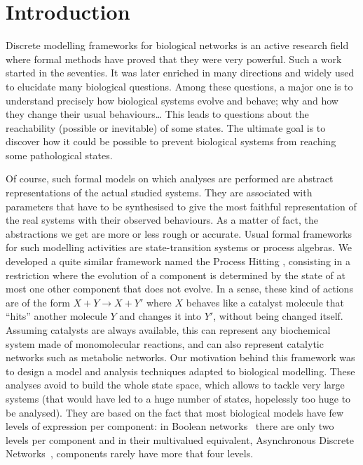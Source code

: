 \section{Introduction}
\label{sec:intro}

Discrete modelling frameworks for biological networks is an active research field where formal methods have proved that they were very powerful.
Such a work started in the seventies.
It was later enriched in many directions and widely used to elucidate many biological questions.
Among these questions, a major one is to understand precisely how biological systems evolve and behave; why and how they change their usual behaviours…
This leads to questions about the reachability (possible or inevitable) of some states.
The ultimate goal is to discover how it could be possible to prevent biological systems from reaching some pathological states.

Of course, such formal models on which analyses are performed are abstract representations of the actual studied systems.
They are associated with parameters that have to be synthesised %
to give the most faithful representation of the real systems with their observed behaviours.
As a matter of fact, the abstractions we get are more or less rough or accurate.
Usual formal frameworks for such modelling activities are state-transition systems or process algebras. %
We developed a quite similar framework named the Process Hitting \cite{PMR10-TCSB},
consisting in a restriction where the evolution of a component is determined by the state of at most one other component that does not evolve.
In a sense, these kind of actions are of the form $X + Y \rightarrow X + Y'$ where $X$ behaves like a catalyst molecule that “hits” another molecule $Y$ and changes it into $Y'$, without being changed itself.
Assuming catalysts are always available, this can represent any biochemical system made of monomolecular reactions, and can also represent catalytic networks such as metabolic networks.
Our motivation behind this framework was to design a model and analysis techniques adapted to biological modelling.
These analyses avoid to build the whole state space, which allows to tackle very large systems (that would have led to a huge number of states, hopelessly too huge to be analysed).
They are based on the fact that most biological models have few levels of expression per component:
in Boolean networks~\cite{kauffman69,Thomas73} there are only two levels per component and in their multivalued equivalent, Asynchronous Discrete Networks~\cite{deJong02}, components rarely have more that four levels.

